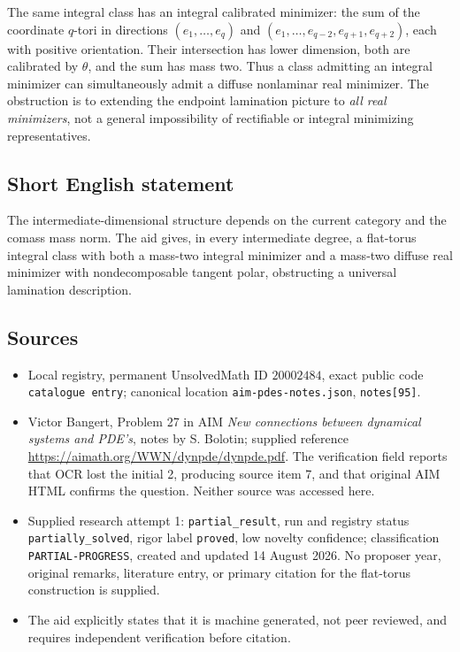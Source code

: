 \documentclass[11pt]{article}
\begin{document}
The same integral class has an integral calibrated minimizer: the sum of the coordinate \(q\)-tori in directions \((e_1,\ldots,e_q)\) and \((e_1,\ldots,e_{q-2},e_{q+1},e_{q+2})\), each with positive orientation. Their intersection has lower dimension, both are calibrated by \(\theta\), and the sum has mass two. Thus a class admitting an integral minimizer can simultaneously admit a diffuse nonlaminar real minimizer. The obstruction is to extending the endpoint lamination picture to \emph{all real minimizers}, not a general impossibility of rectifiable or integral minimizing representatives.
\subsection{Short English statement}
The intermediate-dimensional structure depends on the current category and the comass mass norm. The aid gives, in every intermediate degree, a flat-torus integral class with both a mass-two integral minimizer and a mass-two diffuse real minimizer with nondecomposable tangent polar, obstructing a universal lamination description.
\subsection{Sources}
\begin{itemize}
\item Local registry, permanent UnsolvedMath ID \(20002484\), exact public code \texttt{catalogue entry}; canonical location \texttt{aim-pdes-notes.json}, \texttt{notes[95]}.
\item Victor Bangert, Problem 27 in AIM \emph{New connections between dynamical systems and PDE's}, notes by S. Bolotin; supplied reference \url{https://aimath.org/WWN/dynpde/dynpde.pdf}. The verification field reports that OCR lost the initial 2, producing source item 7, and that original AIM HTML confirms the question. Neither source was accessed here.
\item Supplied research attempt 1: \texttt{partial\_result}, run and registry status \texttt{partially\_solved}, rigor label \texttt{proved}, low novelty confidence; classification \texttt{PARTIAL-PROGRESS}, created and updated 14 August 2026. No proposer year, original remarks, literature entry, or primary citation for the flat-torus construction is supplied.
\item The aid explicitly states that it is machine generated, not peer reviewed, and requires independent verification before citation.
\end{itemize}
\end{document}
